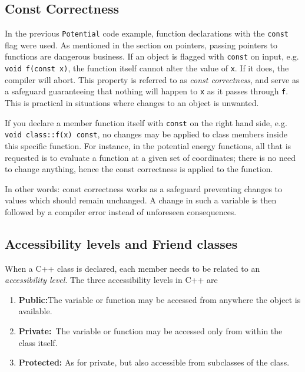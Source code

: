 \subsection{Const Correctness}

In the previous \verb+Potential+ code example, function declarations with the \verb+const+ flag were used. As mentioned in the section on pointers, passing pointers to functions are dangerous business. If an object is flagged with \verb+const+ on input, e.g. \verb+void f(const x)+, the function itself cannot alter the value of \verb+x+. If it does, the compiler will abort. This property is referred to as \textit{const correctness}, and serve as a safeguard guaranteeing that nothing will happen to \verb+x+ as it passes through \verb+f+. This is practical in situations where changes to an object is unwanted.

If you declare a member function itself with \verb+const+ on the right hand side, e.g. \verb+void class::f(x) const+, no changes may be applied to class members inside this specific function. For instance, in the potential energy functions, all that is requested is to evaluate a function at a given set of coordinates; there is no need to change anything, hence the const correctness is applied to the function. 

In other words: const correctness works as a safeguard preventing changes to values which should remain unchanged. A change in such a variable is then followed by a compiler error instead of unforeseen consequences.

\subsection{Accessibility levels and Friend classes}

When a C++ class is declared, each member needs to be related to an \textit{accessibility level}. The three accessibility levels in C++ are 

\begin{enumerate}[label=\textbf{(\roman{*})}, ref=(\roman{*}), align=left]
 \item \textbf{Public:}\qquad The variable or function may be accessed from anywhere the object is available.
 \item \textbf{Private:}\quad\, The variable or function may be accessed only from within the class itself. 
 \item \textbf{Protected:} As for private, but also accessible from subclasses of the class.
 \label{enum:accessibilityLevels}
 \vspace{0.3cm}
\end{enumerate}

